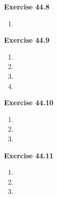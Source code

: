 \textbf{Exercise 44.8}
\begin{enumerate}
    \item 
\end{enumerate}

\textbf{Exercise 44.9}
\begin{enumerate}
    \item 
    \item 
    \item 
    \item 
\end{enumerate}

\textbf{Exercise 44.10}
\begin{enumerate}
    \item 
    \item 
    \item 
\end{enumerate}

\textbf{Exercise 44.11}
\begin{enumerate}
    \item 
    \item 
    \item 
\end{enumerate}

